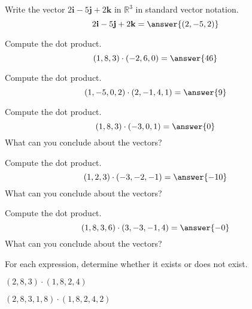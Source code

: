 \documentclass{ximera}
\begin{document}
\begin{problem}
Write the vector $2\mathbf{i}-5\mathbf{j}+2\mathbf{k}$ in $\mathbb{R}^3$ in standard vector notation.
\[
2\mathbf{i}-5\mathbf{j}+2\mathbf{k}=\answer{(2,-5,2)}
\]

\end{problem}

\begin{problem}
Compute the dot product.
\[
(1,8,3)\cdot(-2,6,0)=\answer{46}
\]
\end{problem}

\begin{problem}
Compute the dot product.
\[
(1,-5,0,2)\cdot(2,-1,4,1)=\answer{9}
\]
\end{problem}

\begin{problem}
Compute the dot product.
\[
(1,8,3)\cdot(-3,0,1)=\answer{0}
\]
What can you conclude about the vectors?
\begin{multipleChoice}
\end{multipleChoice}
\end{problem}

\begin{problem}
Compute the dot product.
\[
(1,2,3)\cdot(-3,-2,-1)=\answer{-10}
\]
What can you conclude about the vectors?
\begin{multipleChoice}
\end{multipleChoice}
\end{problem}

\begin{problem}
Compute the dot product.
\[
(1,8,3,6)\cdot(3,-3,-1,4)=\answer{-0}
\]
What can you conclude about the vectors?
\begin{multipleChoice}
\end{multipleChoice}
\end{problem}

\begin{problem}
For each expression, determine whether it exists or does not exist.

$(2,8,3)\cdot (1,8,2,4)$
\begin{multipleChoice}
\end{multipleChoice}

$(2,8,3,1,8)\cdot (1,8,2,4,2)$
\begin{multipleChoice}
\end{multipleChoice}
\end{problem}
\end{document}
